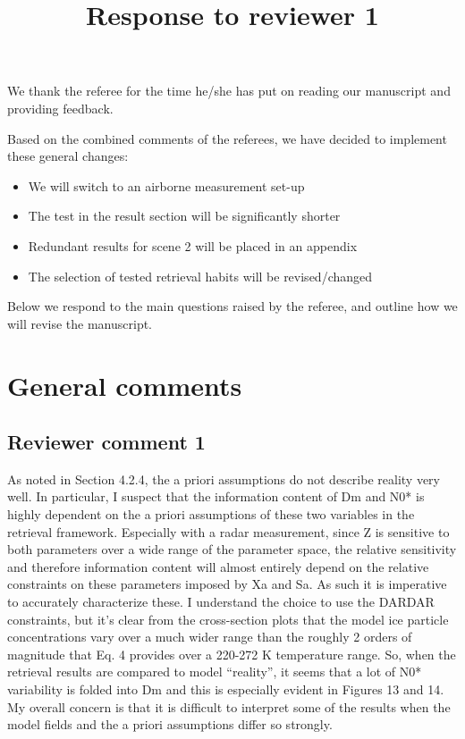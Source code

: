\documentclass[11pt]{scrartcl}
\title{Response to reviewer 1}
\date{}
\begin{document}
\maketitle

\setlength{\parindent}{0cm}

We thank the referee for the time he/she has put on reading our manuscript and providing
feedback.

Based on the combined comments of the referees, we have decided to implement these general
changes:

\begin{itemize}
\item We will switch to an airborne measurement set-up
\item The test in the result section will be significantly shorter
\item Redundant results for scene 2 will be placed in an appendix
\item The selection of tested retrieval habits will be revised/changed
\end{itemize}

Below we respond to the main questions raised by the referee, and outline how we will
revise the manuscript.

\section{General comments}

\subsection*{Reviewer comment 1}

As noted in Section 4.2.4, the a priori assumptions do not describe reality very
well. In particular, I suspect that the information content of Dm and N0* is
highly dependent on the a priori assumptions of these two variables in the
retrieval framework. Especially with a radar measurement, since Z is sensitive
to both parameters over a wide range of the parameter space, the relative
sensitivity and therefore information content will almost entirely depend on the
relative constraints on these parameters imposed by Xa and Sa. As such it is
imperative to accurately characterize these. I understand the choice to use the
DARDAR constraints, but it’s clear from the cross-section plots that the model
ice particle concentrations vary over a much wider range than the roughly 2
orders of magnitude that Eq. 4 provides over a 220-272 K temperature range. So,
when the retrieval results are compared to model “reality”, it seems that a lot
of N0* variability is folded into Dm and this is especially evident in Figures
13 and 14. My overall concern is that it is difficult to interpret some of the
results when the model fields and the a priori assumptions differ so strongly.
\end{document}
